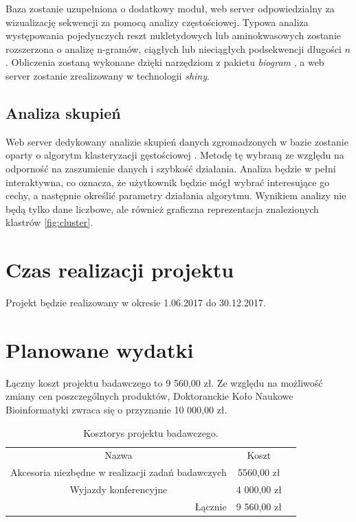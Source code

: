 \documentclass{article}
\begin{document}
Baza zostanie uzupełniona o dodatkowy moduł, web server odpowiedzialny za 
wizualizację sekwencji za pomocą analizy częstościowej. Typowa analiza 
występowania pojedynczych reszt nukletydowych lub aminokwasowych zostanie 
rozszerzona o analizę n-gramów, ciągłych lub nieciągłych podsekwencji długości 
$n$. Obliczenia zostaną wykonane dzięki narzędziom z pakietu \textit{biogram} 
\citep{burdukiewicz_biogram:_2017}, a web server zostanie zrealizowany w 
technologii \textit{shiny}.

\subsection{Analiza skupień}

Web server dedykowany analizie skupień danych zgromadzonych w bazie zostanie 
oparty o algorytm klasteryzacji gęstościowej \citep{ester_density-based_1996}. 
Metodę 
tę wybraną ze względu na odporność na zaszumienie danych i szybkość działania. 
Analiza będzie w pełni interaktywna, co oznacza, że użytkownik będzie mógł 
wybrać interesujące go cechy, a następnie określić parametry działania 
algorytmu. Wynikiem analizy nie będą tylko dane liczbowe, ale również graficzna 
reprezentacja znalezionych klastrów \ref{fig:cluster}.



\section{Czas realizacji projektu}

Projekt będzie realizowany w okresie 1.06.2017 do 30.12.2017.

\section{Planowane wydatki}

Łączny koszt projektu badawczego to 9 560,00 zł. Ze względu na możliwość zmiany 
cen poszczególnych produktów, Doktoranckie Koło Naukowe Bioinformatyki zwraca 
się o przyznanie 10 000,00 zł.

\begin{table}[!htbp]
\centering
\caption{Kosztorys projektu badawczego.}
\begin{tabular}{rrr}
\cline{1-2}
\multicolumn{1}{|c}{Nazwa}                                   & \multicolumn{1}{|c|}{Koszt}   &  \\ \cline{1-2}
\multicolumn{1}{|c}{Akcesoria niezbędne w realizacji zadań badawczych}   & 
\multicolumn{1}{|c|}{5560,00 zł} &  \\ \cline{1-2}
\multicolumn{1}{|c}{Wyjazdy konferencyjne}   & 
\multicolumn{1}{|c|}{4 000,00 zł} &  \\ \cline{1-2}
Łącznie    & 9 560,00 zł                    & 
\end{tabular}
\end{table}
\end{document}
